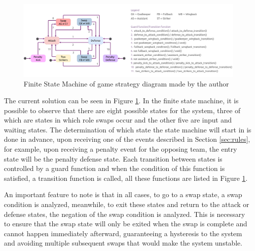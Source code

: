 \begin{figure}[!h]
    \centering
    \includegraphics[width=\linewidth]{images/BehaviorsController FSM.png}
    \caption{Finite State Machine of game strategy diagram made by the author}
    \label{fig:behaviors_controller_fsm}
\end{figure}

The current solution can be seen in Figure \ref{fig:behaviors_controller_fsm}. In the finite state machine, it is possible to observe that there are eight possible states for the system, three of which are states in which role swaps occur and the other five are input and waiting states. The determination of which state the state machine will start in is done in advance, upon receiving one of the events described in Section \ref{sec:rules}, for example, upon receiving a penalty event for the opposing team, the entry state will be the penalty defense state. Each transition between states is controlled by a guard function and when the condition of this function is satisfied, a transition function is called, all these functions are listed in Figure \ref{fig:behaviors_controller_fsm}. 

An important feature to note is that in all cases, to go to a swap state, a swap condition is analyzed, meanwhile, to exit these states and return to the attack or defense states, the negation of the swap condition is analyzed. This is necessary to ensure that the swap state will only be exited when the swap is complete and cannot happen immediately afterward, guaranteeing a hysteresis to the system and avoiding multiple subsequent swaps that would make the system unstable.

